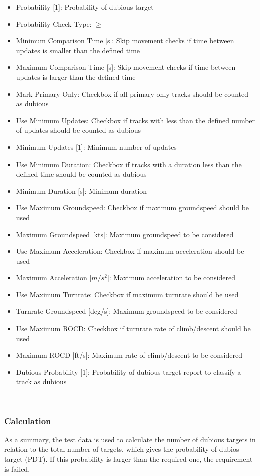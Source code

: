 \begin{itemize}  
\item Probability [1]: Probability of dubious target
\item Probability Check Type: $\geq$
\item Minimum Comparison Time [s]: Skip movement checks if time between updates is smaller than the defined time
\item Maximum Comparison Time [s]: Skip movement checks if time between updates is larger than the defined time
\item Mark Primary-Only: Checkbox if all primary-only tracks should be counted as dubious
\item Use Minimum Updates: Checkbox if tracks with less than the defined number of updates should be counted as dubious
\item Minimum Updates [1]: Minimum number of updates
\item Use Minimum Duration: Checkbox if tracks with a duration less than the defined time should be counted as dubious
\item Minimum Duration [s]: Minimum duration
\item Use Maximum Groundspeed: Checkbox if maximum groundspeed should be used
\item Maximum Groundspeed [kts]: Maximum groundspeed to be considered
\item Use Maximum Acceleration: Checkbox if maximum acceleration should be used
\item Maximum Acceleration [$m/s^{2}$]: Maximum acceleration to be considered
\item Use Maximum Turnrate: Checkbox if maximum turnrate should be used
\item Turnrate Groundspeed [deg/s]: Maximum groundspeed to be considered
\item Use Maximum ROCD: Checkbox if turnrate rate of climb/descent should be used
\item Maximum ROCD [ft/s]: Maximum  rate of climb/descent to be considered
\item Dubious Probability [1]: Probability of dubious target report to classify a track as dubious
\end{itemize}
\ \\

\subsubsection{Calculation}

As a summary, the test data is used to calculate the number of dubious targets in relation to the total number of targets, which gives the probability of dubios target (PDT). If this probability is larger than the required one, the requirement is failed. \\

